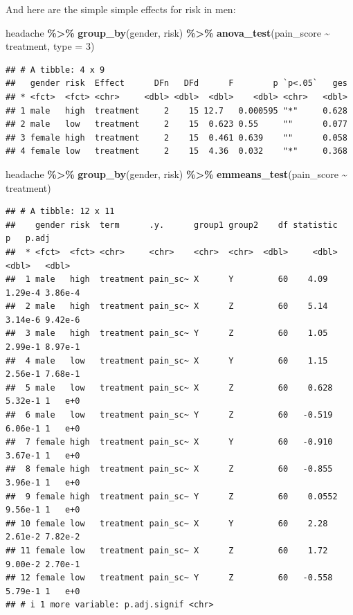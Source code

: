 \documentclass[
]{book}
\newenvironment{Shaded}{\begin{snugshade}}{\end{snugshade}}
\newcommand{\AttributeTok}[1]{\textcolor[rgb]{0.13,0.29,0.53}{#1}}
\newcommand{\DecValTok}[1]{\textcolor[rgb]{0.00,0.00,0.81}{#1}}
\newcommand{\FunctionTok}[1]{\textcolor[rgb]{0.13,0.29,0.53}{\textbf{#1}}}
\newcommand{\NormalTok}[1]{#1}
\newcommand{\SpecialCharTok}[1]{\textcolor[rgb]{0.81,0.36,0.00}{\textbf{#1}}}
\begin{document}
And here are the simple simple effects for risk in men:

\begin{Shaded}
\begin{Highlighting}[]
\NormalTok{headache }\SpecialCharTok{\%\textgreater{}\%}
  \FunctionTok{group\_by}\NormalTok{(gender, risk) }\SpecialCharTok{\%\textgreater{}\%}
  \FunctionTok{anova\_test}\NormalTok{(pain\_score }\SpecialCharTok{\textasciitilde{}}\NormalTok{ treatment, }\AttributeTok{type =} \DecValTok{3}\NormalTok{) }
\end{Highlighting}
\end{Shaded}

\begin{verbatim}
## # A tibble: 4 x 9
##   gender risk  Effect      DFn   DFd      F        p `p<.05`   ges
## * <fct>  <fct> <chr>     <dbl> <dbl>  <dbl>    <dbl> <chr>   <dbl>
## 1 male   high  treatment     2    15 12.7   0.000595 "*"     0.628
## 2 male   low   treatment     2    15  0.623 0.55     ""      0.077
## 3 female high  treatment     2    15  0.461 0.639    ""      0.058
## 4 female low   treatment     2    15  4.36  0.032    "*"     0.368
\end{verbatim}

\begin{Shaded}
\begin{Highlighting}[]
\NormalTok{headache }\SpecialCharTok{\%\textgreater{}\%}
  \FunctionTok{group\_by}\NormalTok{(gender, risk) }\SpecialCharTok{\%\textgreater{}\%}
  \FunctionTok{emmeans\_test}\NormalTok{(pain\_score }\SpecialCharTok{\textasciitilde{}}\NormalTok{ treatment) }
\end{Highlighting}
\end{Shaded}

\begin{verbatim}
## # A tibble: 12 x 11
##    gender risk  term      .y.      group1 group2    df statistic       p   p.adj
##  * <fct>  <fct> <chr>     <chr>    <chr>  <chr>  <dbl>     <dbl>   <dbl>   <dbl>
##  1 male   high  treatment pain_sc~ X      Y         60    4.09   1.29e-4 3.86e-4
##  2 male   high  treatment pain_sc~ X      Z         60    5.14   3.14e-6 9.42e-6
##  3 male   high  treatment pain_sc~ Y      Z         60    1.05   2.99e-1 8.97e-1
##  4 male   low   treatment pain_sc~ X      Y         60    1.15   2.56e-1 7.68e-1
##  5 male   low   treatment pain_sc~ X      Z         60    0.628  5.32e-1 1   e+0
##  6 male   low   treatment pain_sc~ Y      Z         60   -0.519  6.06e-1 1   e+0
##  7 female high  treatment pain_sc~ X      Y         60   -0.910  3.67e-1 1   e+0
##  8 female high  treatment pain_sc~ X      Z         60   -0.855  3.96e-1 1   e+0
##  9 female high  treatment pain_sc~ Y      Z         60    0.0552 9.56e-1 1   e+0
## 10 female low   treatment pain_sc~ X      Y         60    2.28   2.61e-2 7.82e-2
## 11 female low   treatment pain_sc~ X      Z         60    1.72   9.00e-2 2.70e-1
## 12 female low   treatment pain_sc~ Y      Z         60   -0.558  5.79e-1 1   e+0
## # i 1 more variable: p.adj.signif <chr>
\end{verbatim}
\end{document}
